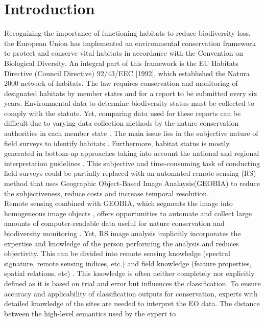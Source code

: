 \documentclass[authoryear, review,12pt,number]{elsarticle}
\begin{document}
\section{Introduction}
Recognizing the importance of functioning habitats to reduce biodiversity loss, 
the European Union has implemented an environmental conservation framework to 
protect and conserve vital habitats in accordance with the Convention on 
Biological Diversity. An integral part of this framework is the EU 
Habitats Directive (Council Directive) 92/43/EEC [1992], which established the 
Natura 2000 network of habitats. The law requires conservation and monitoring 
of designated habitats by member states and for a report to be submitted every 
six years. Environmental data to determine biodiversity status must be 
collected to comply with the statute. Yet, comparing data used for these reports 
can be difficult due to varying data collection methods by the nature 
conservation authorities in each member state \citep{INSPIREdataspecs, INSPIRE}. 
The main issue lies in the subjective nature of field surveys to identify 
habitats \citep{Cherrill1999, Cherrill1999a, Nieland2015}. Furthermore, habitat 
status is mostly generated in bottom-up approaches taking into account the 
national and regional interpretation guidelines \citep{INSPIREdataspecs}. This 
subjective and time-consuming task of conducting field surveys could be 
partially replaced with an automated remote sensing (RS) method that uses  
Geographic Object-Based Image Analaysis(GEOBIA) to reduce the subjectiveness,
reduce costs and increase temporal resolution.
\\
Remote sensing combined with GEOBIA, which segments the image into homogeneous 
image objects \citep{Blaschke2010}, offers opportunities to automate and 
collect large amounts of computer-readable data useful for nature conservation 
and biodiversity monitoring \citep{Corbane2015, VandenBorre2011, Mayer2011}. 
Yet, RS image analysis implicitly incorporates the expertise and knowledge of 
the person performing the analysis and reduces objectivity. This can be divided 
into remote sensing knowledge (spectral signature, remote sensing indices, etc.) 
and field knowledge (feature properties, spatial relations, etc) 
\citep{Andres2013a}. This knowledge is often neither completely nor explicitly 
defined as it is based on trial and error but influences the classification. To 
ensure accuracy and applicability of classification outputs for conservation, 
experts with detailed knowledge of the sites are needed to interpret the EO 
data. The distance between the high-level semantics used by the expert to 
\end{document}

